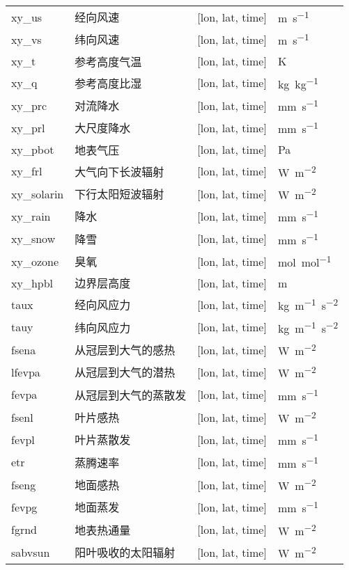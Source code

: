 {\begin{longtable}[htbp]{lp{}p{}l}
xy\_us & 经向风速 & {[}lon, lat, time{]} & \unit{m.s^{-1}} \\
xy\_vs & 纬向风速 & {[}lon, lat, time{]} & \unit{m.s^{-1}} \\
xy\_t & 参考高度气温 & {[}lon, lat, time{]}  & K \\
xy\_q & 参考高度比湿 & {[}lon, lat, time{]}  & \unit{kg.kg^{-1}} \\
xy\_prc & 对流降水 & {[}lon, lat, time{]}  & \unit{mm.s^{-1}} \\
xy\_prl & 大尺度降水 & {[}lon, lat, time{]}  & \unit{mm.s^{-1}} \\
xy\_pbot & 地表气压 & {[}lon, lat, time{]}  & Pa \\
xy\_frl & 大气向下长波辐射 & {[}lon, lat, time{]}  & \unit{W.m^{-2}} \\
xy\_solarin & 下行太阳短波辐射 & {[}lon, lat, time{]}  & \unit{W.m^{-2}} \\
xy\_rain & 降水 & {[}lon, lat, time{]}  & \unit{mm.s^{-1}} \\
xy\_snow & 降雪 & {[}lon, lat, time{]}  & \unit{mm.s^{-1}} \\
xy\_ozone & 臭氧 & {[}lon, lat, time{]}  & \unit{mol.mol^{-1}} \\
xy\_hpbl & 边界层高度 & {[}lon, lat, time{]} & \unit{m} \\
taux & 经向风应力 & {[}lon, lat, time{]}  & \unit{kg.m^{-1}.s^{-2}} \\
tauy & 纬向风应力 & {[}lon, lat, time{]}  & \unit{kg.m^{-1}.s^{-2}} \\
fsena & 从冠层到大气的感热 & {[}lon, lat, time{]}  & \unit{W.m^{-2}} \\
lfevpa & 从冠层到大气的潜热 & {[}lon, lat, time{]}  & \unit{W.m^{-2}} \\
fevpa & 从冠层到大气的蒸散发 & {[}lon, lat, time{]}  & \unit{mm.s^{-1}} \\
fsenl & 叶片感热 & {[}lon, lat, time{]}  & \unit{W.m^{-2}} \\
fevpl & 叶片蒸散发 & {[}lon, lat, time{]}  & \unit{mm.s^{-1}} \\
etr & 蒸腾速率 & {[}lon, lat, time{]}  & \unit{mm.s^{-1}} \\
fseng & 地面感热 & {[}lon, lat, time{]}  & \unit{W.m^{-2}} \\
fevpg & 地面蒸发 & {[}lon, lat, time{]}  & \unit{mm.s^{-1}} \\
fgrnd & 地表热通量 & {[}lon, lat, time{]}  & \unit{W.m^{-2}} \\
sabvsun & 阳叶吸收的太阳辐射 & {[}lon, lat, time{]}  & \unit{W.m^{-2}} \\

\end{longtable}}
